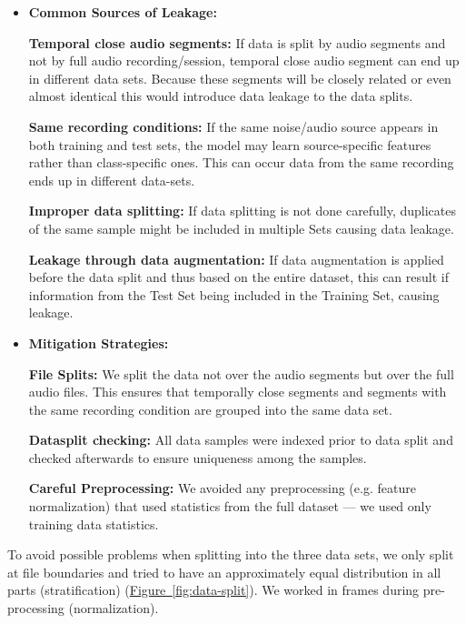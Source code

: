 \begin{itemize}
	\item {\bf Common Sources of Leakage: } 
    
		{\bf Temporal close audio segments: } If data is split by audio segments and not by full audio recording/session, temporal close audio segment can end up in different data sets. Because these segments will be closely related or even almost identical this would introduce data leakage to the data splits. 
        
		{\bf Same recording conditions: } If the same noise/audio source appears in both training and test sets, the model may learn source-specific features rather than class-specific ones. This can occur data from the same recording ends up in different data-sets. 

        {\bf Improper data splitting: } If data splitting is not done carefully, duplicates of the same sample might be included in multiple Sets causing data leakage.
        
        {\bf Leakage through data augmentation: } If data augmentation is applied before the data split and thus based on the entire dataset, this can result if information from the Test Set being included in the Training Set, causing leakage.\\
	
	\item {\bf Mitigation Strategies: } 
    
		{\bf File Splits:} We split the data not over the audio segments but over the full audio files. This ensures that temporally close segments and segments with the same recording condition are grouped into the same data set.

		{\bf Datasplit checking:} All data samples were indexed prior to data split and checked afterwards to ensure uniqueness among the samples. 
        
		{\bf Careful Preprocessing:} We avoided any preprocessing (e.g. feature normalization) that used statistics from the full dataset — we used only training data statistics. 
\end{itemize}


To avoid possible problems when splitting into the three data sets, 
we only split at file boundaries and tried to have an approximately equal distribution in all parts (stratification)  (\hyperref[fig:data-split]{Figure~\ref*{fig:data-split}}).
We worked in frames during pre-processing (normalization).





